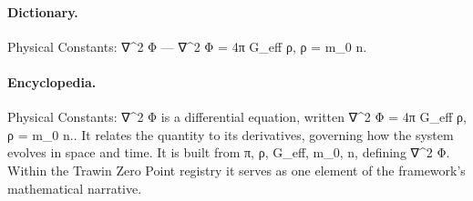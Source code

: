\paragraph{Dictionary.}
Physical Constants: ∇\textasciicircum{}2 Φ — ∇\textasciicircum{}2 Φ = 4π G\_eff ρ, ρ = m\_0 n.

\paragraph{Encyclopedia.}
Physical Constants: ∇\textasciicircum{}2 Φ is a differential equation, written ∇\textasciicircum{}2 Φ = 4π G\_eff ρ, ρ = m\_0 n.. It relates the quantity to its derivatives, governing how the system evolves in space and time. It is built from π, ρ, G\_eff, m\_0, n, defining ∇\textasciicircum{}2 Φ. Within the Trawin Zero Point registry it serves as one element of the framework's mathematical narrative.
